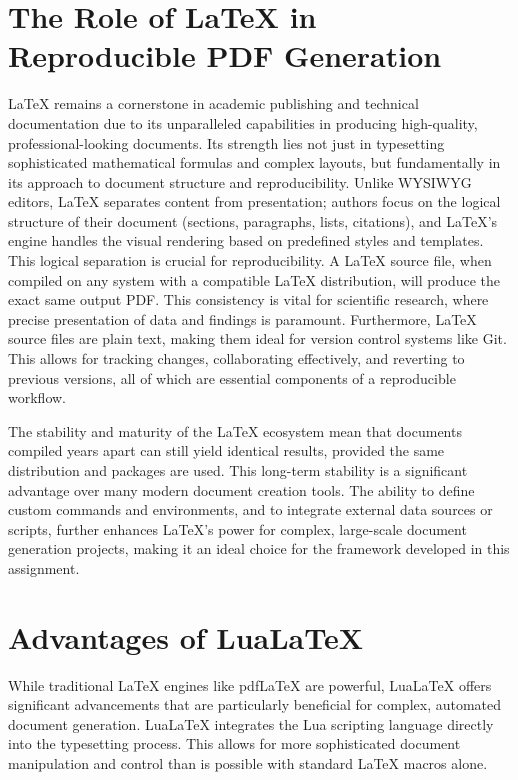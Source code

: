 \documentclass{custom-academic-template}
\begin{document}
\section{The Role of LaTeX in Reproducible PDF Generation}
LaTeX remains a cornerstone in academic publishing and technical documentation due to its unparalleled capabilities in producing high-quality, professional-looking documents. Its strength lies not just in typesetting sophisticated mathematical formulas and complex layouts, but fundamentally in its approach to document structure and reproducibility. Unlike WYSIWYG editors, LaTeX separates content from presentation; authors focus on the logical structure of their document (sections, paragraphs, lists, citations), and LaTeX's engine handles the visual rendering based on predefined styles and templates. This logical separation is crucial for reproducibility. A LaTeX source file, when compiled on any system with a compatible LaTeX distribution, will produce the exact same output PDF. This consistency is vital for scientific research, where precise presentation of data and findings is paramount. Furthermore, LaTeX source files are plain text, making them ideal for version control systems like Git. This allows for tracking changes, collaborating effectively, and reverting to previous versions, all of which are essential components of a reproducible workflow.

The stability and maturity of the LaTeX ecosystem mean that documents compiled years apart can still yield identical results, provided the same distribution and packages are used. This long-term stability is a significant advantage over many modern document creation tools. The ability to define custom commands and environments, and to integrate external data sources or scripts, further enhances LaTeX's power for complex, large-scale document generation projects, making it an ideal choice for the framework developed in this assignment.

\section{Advantages of LuaLaTeX}
While traditional LaTeX engines like pdfLaTeX are powerful, LuaLaTeX offers significant advancements that are particularly beneficial for complex, automated document generation. LuaLaTeX integrates the Lua scripting language directly into the typesetting process. This allows for more sophisticated document manipulation and control than is possible with standard LaTeX macros alone.
\end{document}

